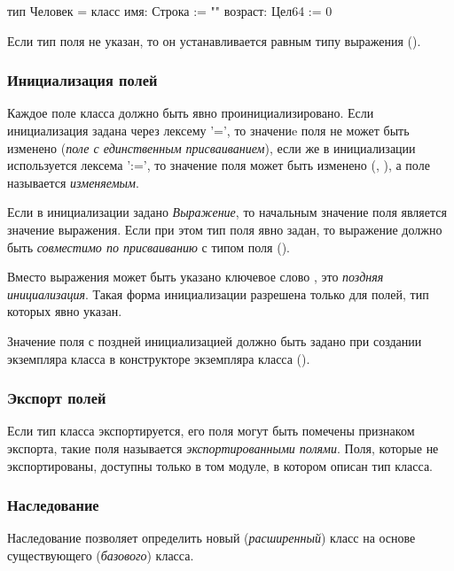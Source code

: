 \begin{Trivil}
тип Человек = класс {
    имя: Строка := ""
    возраст: Цел64 := 0
}
\end{Trivil}

Если тип поля не указан, то он устанавливается равным типу выражения ().

\hypertarget{fields-init}{%
\subsubsection{Инициализация полей}\label{decls:fields-init}}

Каждое поле класса должно быть явно проинициализировано.
Если инициализация задана через лексему '=', то значениe поля не может быть изменено (\emph{поле с единственным присваиванием}), 
если же в инициализации используется лексема ':=', то значение поля может быть изменено  (, ), а поле называется \emph{изменяемым}.

Если в инициализации задано \emph{Выражение}, то начальным значение поля является значение выражения.
Если при этом тип поля явно задан, то выражение должно быть \emph{совместимо по присваиванию} с типом поля ().

Вместо выражения может быть указано ключевое слово , это \emph{поздняя инициализация}. 
Такая форма инициализации разрешена только для полей, тип которых явно указан.

Значение поля с поздней инициализацией должно быть задано при создании экземпляра класса в конструкторе экземпляра класса (). 

\hypertarget{exported-fields}{%
\subsubsection{Экспорт полей}\label{decls:exported-fields}}

Если тип класса экспортируется, его поля могут быть помечены признаком экспорта, такие поля называется \emph{экспортированными полями}.
Поля, которые не экспортированы, доступны только в том модуле, в котором описан тип класса.

\hypertarget{inheritance}{%
\subsubsection{Наследование}\label{decls:inheritance}}

Наследование позволяет определить новый (\emph{расширенный}) класс  на основе существующего (\emph{базового}) класса. 

